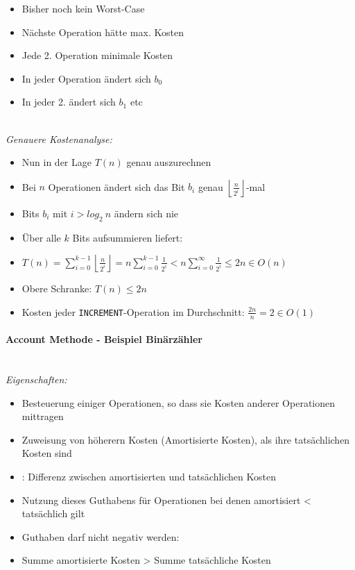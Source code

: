 \documentclass[
    ngerman,
    color=3b,
    dark_mode,
    load_common, %
    summary,
    boxarc,
]{tuda_summary}
\begin{document}
\begin{minipage}{0.5\textwidth-2.22168pt}
    \begin{itemize}
        \item Bisher noch kein Worst-Case
        \item Nächste Operation hätte max. Kosten
        \item Jede 2. Operation minimale Kosten
        \item In jeder Operation ändert sich $b_0$
        \item In jeder 2. ändert sich $b_1$ etc
    \end{itemize}
\end{minipage}
\vspace{1em}\\
\textit{Genauere Kostenanalyse:}
\begin{itemize}
    \item Nun in der Lage $T(n)$ genau auszurechnen
    \item Bei $n$ Operationen ändert sich das Bit $b_i$ genau $\left \lfloor \frac{n}{2^i} \right \rfloor$-mal
    \item Bits $b_i$ mit $i > log_2~n$ ändern sich nie
    \item Über alle $k$ Bits aufsummieren liefert:
    \item[] $T(n)= \sum^{k-1}_{i=0} \left \lfloor \frac{n}{2^i} \right \rfloor = n \sum^{k-1}_{i=0} \frac{1}{2^i}
              < n \sum^{\infty}_{i=0} \frac{1}{2^i} \leq 2n \in O(n)$
    \item Obere Schranke: $T(n) \leq 2n$
    \item Kosten jeder \texttt{INCREMENT}-Operation im Durchschnitt: $\frac{2n}{n} = 2 \in O(1)$

\end{itemize}

\pagebreak

\paragraph{Account Methode - Beispiel Binärzähler}\mbox{}\vspace{1em}\\
\textit{Eigenschaften:}
          \begin{itemize}
              \item Besteuerung einiger Operationen, so dass sie Kosten anderer Operationen mittragen
              \item Zuweisung von höherern Kosten (Amortisierte Kosten), als ihre tatsächlichen Kosten sind
              \item {}: Differenz zwischen amortisierten und tatsächlichen Kosten
              \item Nutzung dieses Guthabens für Operationen bei denen amortisiert < tatsächlich gilt
              \item Guthaben darf nicht negativ werden:
              \item[] Summe amortisierte Kosten > Summe tatsächliche Kosten
          \end{itemize}
\end{document}

